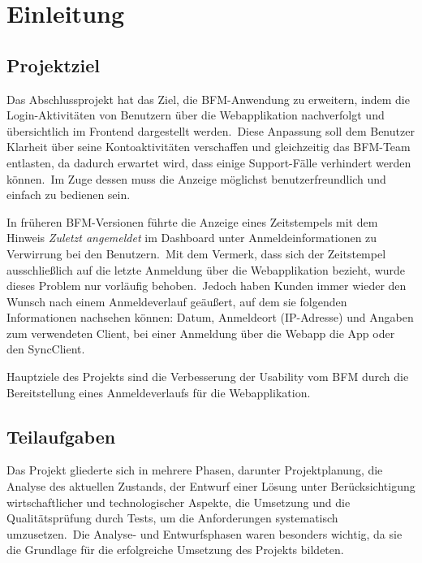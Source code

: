 \section{Einleitung}
\label{sec:Einleitung}

\subsection{Projektziel}
\label{subsec:Projektziel}

Das Abschlussprojekt hat das Ziel, die BFM-Anwendung zu erweitern, indem die Login-Aktivitäten von Benutzern über die Webapplikation nachverfolgt und übersichtlich im Frontend
dargestellt werden.\ Diese Anpassung soll dem Benutzer Klarheit über seine Kontoaktivitäten verschaffen und gleichzeitig das BFM-Team entlasten, da dadurch erwartet wird, dass
einige Support-Fälle verhindert werden können.\ Im Zuge dessen muss die Anzeige möglichst benutzerfreundlich und einfach zu bedienen sein.

In früheren BFM-Versionen führte die Anzeige eines Zeitstempels mit dem Hinweis \textit{Zuletzt angemeldet} im Dashboard unter Anmeldeinformationen zu Verwirrung bei den Benutzern.\
Mit dem Vermerk, dass sich der Zeitstempel ausschließlich auf die letzte Anmeldung über die Webapplikation bezieht, wurde dieses Problem nur vorläufig behoben.\ Jedoch haben Kunden immer wieder den
Wunsch nach einem Anmeldeverlauf geäußert, auf dem sie folgenden Informationen nachsehen können: Datum, Anmeldeort (IP-Adresse) und Angaben zum verwendeten Client, \zB bei einer Anmeldung über die Webapp
die App oder den SyncClient.

Hauptziele des Projekts sind die Verbesserung der Usability vom BFM durch die Bereitstellung eines Anmeldeverlaufs für die Webapplikation.

\subsection{Teilaufgaben}
\label{subsec:Teilaufgaben}

Das Projekt gliederte sich in mehrere Phasen, darunter Projektplanung, die Analyse des aktuellen Zustands, der Entwurf einer Lösung unter Berücksichtigung %
wirtschaftlicher und technologischer Aspekte, die Umsetzung und die Qualitätsprüfung durch Tests, um die Anforderungen systematisch umzusetzen.\ Die Analyse- und Entwurfsphasen waren besonders wichtig,
da sie die Grundlage für die erfolgreiche Umsetzung des Projekts bildeten.

